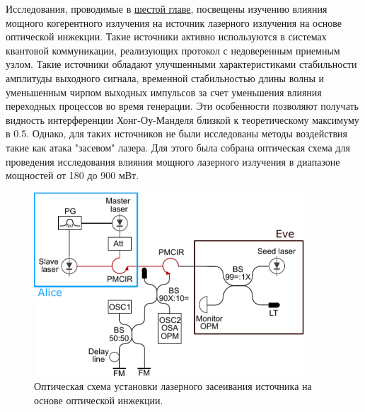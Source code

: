 \newpage Исследования, проводимые в \underline{шестой главе}, посвещены изучению влияния мощного когерентного излучения на источник лазерного излучения на основе оптической инжекции. Такие источники активно используются в системах квантовой коммуникации, реализующих протокол с недоверенным приемным узлом. Такие источники обладают улучшенными характеристиками стабильности амплитуды выходного сигнала, временной стабильностью длины волны и уменьшенным чирпом выходных импульсов за счет уменьшения влияния переходных процессов во время генерации. Эти особенности позволяют получать видность интерференции Хонг-Оу-Манделя близкой к теоретическому максимуму в 0.5. 
\newline Однако, для таких источников не были исследованы методы воздействия такие как атака "засевом" лазера. Для этого была собрана оптическая схема для проведения исследования влияния мощного лазерного излучения в диапазоне мощностей от 180 до 900 мВт. 
\begin{figure}
    \centering
    \includegraphics[width=0.9\textwidth]{images/setup_Faraday_Mirrors_final.pdf}
    \caption{Оптическая схема установки лазерного засеивания источника на основе оптической инжекции.}
    \label{fig:enter-label}
\end{figure}


